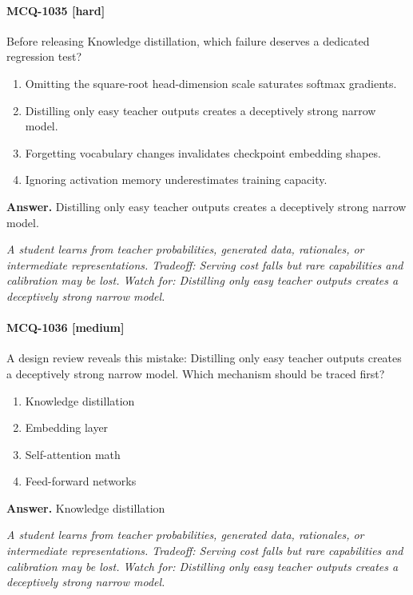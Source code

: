 \paragraph{MCQ-1035 [hard]} Before releasing Knowledge distillation, which failure deserves a dedicated regression test?
\begin{enumerate}[label=\Alph*.]
\item Omitting the square-root head-dimension scale saturates softmax gradients.
\item Distilling only easy teacher outputs creates a deceptively strong narrow model.
\item Forgetting vocabulary changes invalidates checkpoint embedding shapes.
\item Ignoring activation memory underestimates training capacity.
\end{enumerate}
\noindent\textbf{Answer.} Distilling only easy teacher outputs creates a deceptively strong narrow model.
\par\textit{A student learns from teacher probabilities, generated data, rationales, or intermediate representations. Tradeoff: Serving cost falls but rare capabilities and calibration may be lost. Watch for: Distilling only easy teacher outputs creates a deceptively strong narrow model.}
\paragraph{MCQ-1036 [medium]} A design review reveals this mistake: Distilling only easy teacher outputs creates a deceptively strong narrow model. Which mechanism should be traced first?
\begin{enumerate}[label=\Alph*.]
\item Knowledge distillation
\item Embedding layer
\item Self-attention math
\item Feed-forward networks
\end{enumerate}
\noindent\textbf{Answer.} Knowledge distillation
\par\textit{A student learns from teacher probabilities, generated data, rationales, or intermediate representations. Tradeoff: Serving cost falls but rare capabilities and calibration may be lost. Watch for: Distilling only easy teacher outputs creates a deceptively strong narrow model.}
